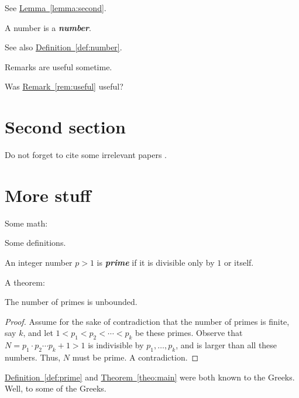 \documentclass[12pt]{article}
\providecommand{\emphic}[2]{}
\renewcommand{\emphic}[2]{\textcolor{blue25emph}{%
      \textbf{\emph{#1}}}\index{#2}}
\providecommand{\emphi}[1]{}%
\renewcommand{\emphi}[1]{\emphic{#1}{#1}}
\newcommand{\HLink}[2]{\hyperref[#2]{#1~\ref*{#2}}}
\newcommand{\thmlab}[1]{{\label{theo:#1}}}
\newcommand{\thmref}[1]{\HLink{Theorem}{theo:#1}}
\newcommand{\remlab}[1]{\label{rem:#1}}
\newcommand{\remref}[1]{\HLink{Remark}{rem:#1}}%
\providecommand{\deflab}[1]{}
\renewcommand{\deflab}[1]{\label{def:#1}}
\newcommand{\defref}[1]{\HLink{Definition}{def:#1}}
\newcommand{\lemref}[1]{\HLink{Lemma}{lemma:#1}}%
\begin{document}
See \lemref{second}.

\begin{definition}
    \deflab{number}
    A number is a \emphi{number}.
\end{definition}

See also \defref{number}.

\begin{remark}
    \remlab{useful}
    Remarks are useful sometime.
\end{remark}

Was \remref{useful} useful?

\section{Second section}


Do not forget to cite some irrelevant papers \cite{k-spda-10}.


\section{More stuff}
Some math:

Some definitions.
\begin{definition}
    \deflab{prime}%
    An integer number $p > 1$ is \emphi{prime} if it is divisible
    only by $1$ or itself.
\end{definition}

A theorem:
\begin{theorem}
    \thmlab{main}%
    The number of primes is unbounded.
\end{theorem}
\begin{proof}
    Assume for the sake of contradiction that the number of primes is
    finite, say $k$, and let $1 < p_1< p_2 < \cdots < p_k$ be these
    primes. Observe that $N = p_1 \cdot p_2 \cdots p_k +1 > 1$ is
    indivisible by $p_1, \ldots, p_k$, and is larger than all these
    numbers. Thus, $N$ must be prime. A contradiction.
\end{proof}

\defref{prime} and \thmref{main} were both known to the Greeks. Well,
to some of the Greeks.
\end{document}
